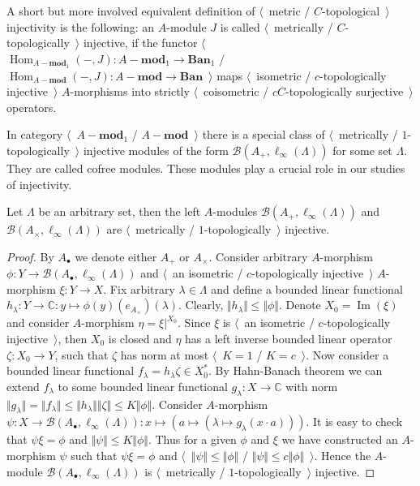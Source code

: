 A short but more involved equivalent definition 
of $\langle$~metric / $C$-topological~$\rangle$ injectivity is the following: 
an $A$-module $J$ is called $\langle$~metrically / $C$-topologically~$\rangle$ 
injective, if the functor
$\langle$~$\operatorname{Hom}_{A-\mathbf{mod}_1}(-,J)
:A-\mathbf{mod}_1\to\mathbf{Ban}_1$
/
$\operatorname{Hom}_{A-\mathbf{mod}}(-,J)
:A-\mathbf{mod}\to\mathbf{Ban}$~$\rangle$
maps $\langle$~isometric / $c$-topologically injective~$\rangle$
$A$-morphisms into strictly $\langle$~coisometric / 
$c C$-topologically surjective~$\rangle$ operators. 

In category $\langle$~$A-\mathbf{mod}_1$ / $A-\mathbf{mod}$~$\rangle$ there
is a special class of $\langle$~metrically / $1$-topologically~$\rangle$
injective modules of the form $\mathcal{B}(A_+, \ell_\infty(\Lambda))$ for 
some set $\Lambda$. They are called cofree modules. These modules play a crucial 
role in our studies of injectivity.

\begin{proposition}\label{MetCTopCofreeMod} Let $\Lambda$ be an arbitrary 
set, then the left $A$-modules $\mathcal{B}(A_+, \ell_\infty(\Lambda))$ 
and $\mathcal{B}(A_\times, \ell_\infty(\Lambda))$
are $\langle$~metrically / $1$-topologically~$\rangle$ injective. 
\end{proposition}
\begin{proof} By $A_\bullet$ we denote either $A_+$ or $A_\times$.
Consider arbitrary $A$-morphism 
$\phi:Y\to \mathcal{B}(A_\bullet, \ell_\infty(\Lambda))$ and 
$\langle$~an isometric / $c$-topologically injective~$\rangle$ 
$A$-morphism $\xi:Y\to X$. Fix arbitrary $\lambda\in\Lambda$ and define 
a bounded linear functional 
$h_\lambda:Y\to\mathbb{C}:y\mapsto \phi(y)(e_{A_\times})(\lambda)$. 
Clearly, $\Vert h_\lambda\Vert\leq\Vert \phi\Vert$.
Denote $X_0=\operatorname{Im}(\xi)$ and consider 
$A$-morphism $\eta=\xi|^{X_0}$. Since $\xi$ is 
$\langle$~an isometric / $c$-topologically injective~$\rangle$, then $X_0$ is
closed and $\eta$ has a left inverse bounded linear operator $\zeta:X_0\to Y$, 
such that $\zeta$ has norm at most $\langle$~$K=1$ / $K=c$~$\rangle$. 
Now consider a bounded linear functional  $f_\lambda=h_\lambda\zeta\in X_0^*$. 
By Hahn-Banach theorem we can extend $f_\lambda$ to some bounded linear functional
$g_\lambda:X\to\mathbb{C}$ with norm  
$\Vert g_\lambda\Vert
=\Vert f_\lambda\Vert
\leq\Vert h_\lambda\Vert\Vert\zeta\Vert
\leq K\Vert \phi\Vert$. 
Consider $A$-morphism 
$\psi
:X\to \mathcal{B}(A_\bullet, \ell_\infty(\Lambda))
:x\mapsto (a\mapsto (\lambda\mapsto g_\lambda(x\cdot a)))$. 
It is easy to check that $\psi\xi=\phi$ and 
$\Vert\psi\Vert\leq K\Vert\phi\Vert$. Thus for a given $\phi$ 
and $\xi$ we have constructed an $A$-morphism $\psi$ such that $\psi\xi=\phi$ 
and $\langle$~$\Vert\psi\Vert\leq\Vert\phi\Vert$ /
$\Vert\psi\Vert\leq c\Vert\phi\Vert$~$\rangle$. Hence the 
$A$-module $\mathcal{B}(A_\bullet, \ell_\infty(\Lambda))$ is 
$\langle$~metrically / $1$-topologically~$\rangle$ injective.
\end{proof}


